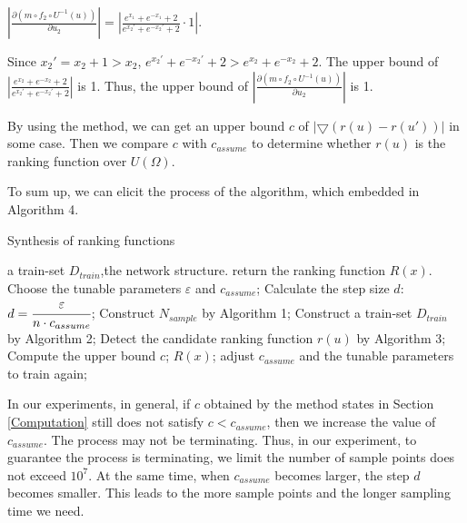 \begin{exam}
	$\left| {\frac{{\partial (m \circ {f_2} \circ {U^{ - 1}}(u))}}{{\partial {u_2}}}} \right| = \left| {\frac{{{e^{{x_1}}} + {e^{ - {x_1}}} + 2}}{{{e^{{x_2}' }} + {e^{ - {x_2}' }} + 2}}\cdot 1} \right|.$
	
	Since $x_{2}'=x_2+1>x_2$, ${{e^{x_{2}'}} + {e^{ - {x_{2}'}}} + 2} > {{e^{{x_2}}} + {e^{ - {x_2}}} + 2}$. The upper bound of $\left| {\frac{{{e^{{x_2}}} + {e^{ - {x_2}}} + 2}}{{{e^{{x_{2}'}}} + {e^{ - {x_{2}'}}} + 2}}} \right|$ is 1. Thus, the upper bound of $\left| {\frac{{\partial (m \circ {f_2} \circ {U^{ - 1}}(u))}}{{\partial {u_2}}}} \right|$ is 1.
	
\end{exam}

By using the method, we can get an upper bound $c$ of $\left| \bigtriangledown{(r(u) - r(u'))} \right|$ in some case. Then we compare $c$ with ${c_{assume}}$ to determine whether $r(u)$ is the ranking function over $U(\Omega )$.

To sum up, we can elicit the process of the algorithm, which embedded in Algorithm 4. 
\begin{algorithm}[H]\label{algorithm4}
	\caption{Synthesis of ranking functions}
	\begin{algorithmic}[1] %
		\Require a train-set ${D_{train}}$,the network structure.            
		\Ensure return the ranking function $R(x)$.
		\State Choose the tunable parameters $\varepsilon$ and $c_{assume}$;
		\State Calculate the step size $d$: $d=\cfrac{\varepsilon}{n\cdot c_{assume}}$;
		\State Construct $N_{sample}$ by Algorithm 1;
		\State Construct a train-set $D_{train}$ by Algorithm 2;
		\State Detect the candidate ranking function $r(u)$ by Algorithm 3;
		\State Compute the upper bound $c$;
		\State \Return $R(x)$;
		\Else
		\State adjust $c_{assume}$ and the tunable parameters to train again;
		\EndIf
	\end{algorithmic}
\end{algorithm}
\begin{rem}
	In our experiments, in general, if $c$ obtained by the method states in Section \ref{Computation} still does not satisfy $c < c_{assume}$, then we increase the value of $c_{assume}$. The process may not be terminating. Thus, in our experiment, to guarantee the process is terminating, we limit the number of sample points does not exceed $10^7$. At the same time, when $c_{assume}$ becomes larger, the step $d$ becomes smaller. This leads to the more sample points and the longer sampling time we need.
\end{rem}

